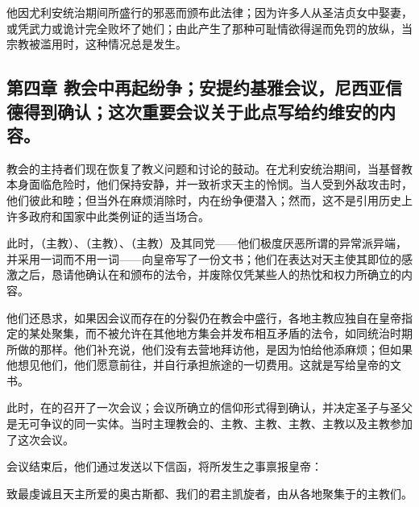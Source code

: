 他因尤利安统治期间所盛行的邪恶而颁布此法律；因为许多人从圣洁贞女中娶妻，或凭武力或诡计完全败坏了她们；由此产生了那种可耻情欲得逞而免罚的放纵，当宗教被滥用时，这种情况总是发生。\par


\subsection{第四章 教会中再起纷争；安提约基雅会议，尼西亚信德得到确认；这次重要会议关于此点写给约维安的内容。}

教会的主持者们现在恢复了教义问题和讨论的鼓动。在尤利安统治期间，当基督教本身面临危险时，他们保持安静，并一致祈求天主的怜悯。当人受到外敌攻击时，他们彼此和睦；但当外在麻烦消除时，内在纷争便潜入；然而，这不是引用历史上许多政府和国家中此类例证的适当场合。\par

此时，（主教）、（主教）、（主教）及其同党——他们极度厌恶所谓的异常派异端，并采用一词而不用一词——向皇帝写了一份文书；他们在表达对天主使其即位的感激之后，恳请他确认在和颁布的法令，并废除仅凭某些人的热忱和权力所确立的内容。\par

他们还恳求，如果因会议而存在的分裂仍在教会中盛行，各地主教应独自在皇帝指定的某处聚集，而不被允许在其他地方集会并发布相互矛盾的法令，如同统治时期所做的那样。他们补充说，他们没有去营地拜访他，是因为怕给他添麻烦；但如果他想见他们，他们愿意前往，并自行承担旅途的一切费用。这就是写给皇帝的文书。\par

此时，在的召开了一次会议；会议所确立的信仰形式得到确认，并决定圣子与圣父是无可争议的同一实体。当时主理教会的、主教、主教、主教、主教以及主教参加了这次会议。\par

会议结束后，他们通过发送以下信函，将所发生之事禀报皇帝：\par

致最虔诚且天主所爱的奥古斯都、我们的君主凯旋者，由从各地聚集于的主教们。\par

